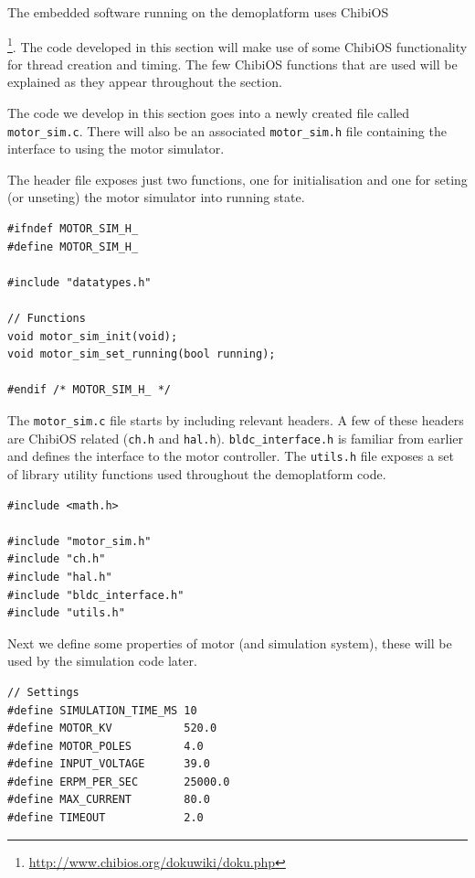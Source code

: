 \documentclass[12pt]{article} %
\begin{document}
The embedded software running on the demoplatform uses
ChibiOS{\footnote{\url{http://www.chibios.org/dokuwiki/doku.php}}. The
  code developed in this section will make use of some ChibiOS
  functionality for thread creation and timing. The few ChibiOS
  functions that are used will be explained as they appear throughout
  the section.

The code we develop in this section goes into a newly created file
called {\verb!motor_sim.c!}. There will also be an associated
{\verb!motor_sim.h!} file containing the interface to using the motor
simulator.

The header file exposes just two functions, one for initialisation and one for seting (or unseting) the motor simulator into running state.

\begin{Verbatim}[samepage=true,frame=single,label=Embedded/RC\_Controller/motor\_sim.h]
#ifndef MOTOR_SIM_H_
#define MOTOR_SIM_H_

#include "datatypes.h"

// Functions
void motor_sim_init(void);
void motor_sim_set_running(bool running);

#endif /* MOTOR_SIM_H_ */
\end{Verbatim}

The {\verb!motor_sim.c!} file starts by including relevant headers. A
few of these headers are ChibiOS related (\verb!ch.h! and
\verb!hal.h!). \verb!bldc_interface.h! is familiar from earlier and
defines the interface to the motor controller. The \verb!utils.h! file
exposes a set of library utility functions used throughout the
demoplatform code.

\begin{Verbatim}[samepage=true,frame=single,label=Embedded/RC\_Controller/motor\_sim.c]
#include <math.h>

#include "motor_sim.h"
#include "ch.h"
#include "hal.h"
#include "bldc_interface.h"
#include "utils.h"
\end{Verbatim}

Next we define some properties of motor (and simulation system), these will be used by
the simulation code later. 

\begin{Verbatim}[samepage=true,frame=single,label=Embedded/RC\_Controller/motor\_sim.c]  
// Settings
#define SIMULATION_TIME_MS 10
#define MOTOR_KV           520.0
#define MOTOR_POLES        4.0
#define INPUT_VOLTAGE      39.0
#define ERPM_PER_SEC       25000.0
#define MAX_CURRENT        80.0
#define TIMEOUT            2.0
\end{Verbatim}

}
\end{document}
